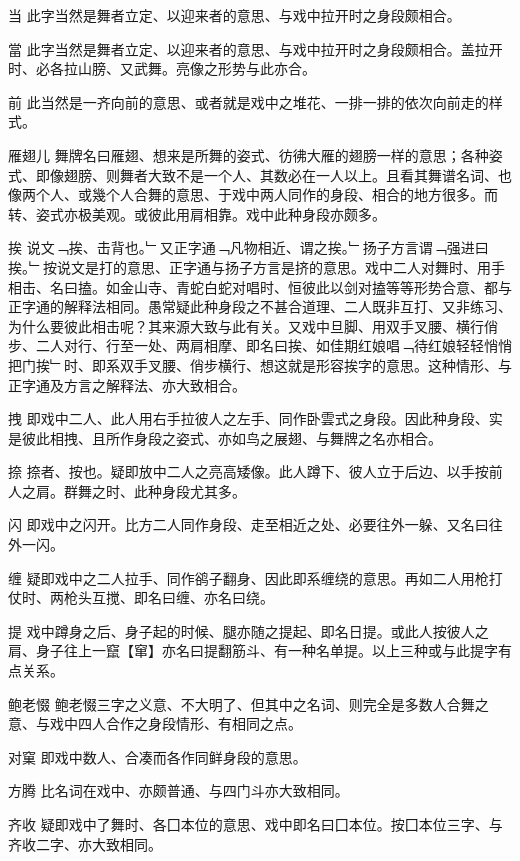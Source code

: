\quad 当
\quad 
此字当然是舞者立定、以迎来者的意思、与戏中拉开时之身段颇相合。

\quad 當
\quad 
此字当然是舞者立定、以迎来者的意思、与戏中拉开时之身段颇相合。盖拉开时、必各拉山膀、又武舞。亮像之形势与此亦合。

\quad 前
\quad 
此当然是一齐向前的意思、或者就是戏中之堆花、一排一排的依次向前走的样式。

\quad 雁翅儿
\quad 
舞牌名曰雁翅、想来是所舞的姿式、彷彿大雁的翅膀一样的意思；各种姿式、即像翅膀、则舞者大致不是一个人、其数必在一人以上。且看其舞谱名词、也像两个人、或幾个人合舞的意思、于戏中两人同作的身段、相合的地方很多。而转、姿式亦极美观。或彼此用肩相靠。戏中此种身段亦颇多。

\quad 挨
\quad 
说文﹁挨、击背也。﹂又正字通﹁凡物相近、谓之挨。﹂扬子方言谓﹁强进曰挨。﹂按说文是打的意思、正字通与扬子方言是挤的意思。戏中二人对舞时、用手相击、名曰搕。如金山寺、青蛇白蛇对唱时、恒彼此以剑对搕等等形势合意、都与正字通的解释法相同。愚常疑此种身段之不甚合道理、二人既非互打、又非练习、为什么要彼此相击呢？其来源大致与此有关。又戏中旦脚、用双手叉腰、横行俏步、二人对行、行至一处、两肩相摩、即名曰挨、如佳期红娘唱﹁待红娘轻轻悄悄把门挨﹂时、即系双手叉腰、俏步横行、想这就是形容挨字的意思。这种情形、与正字通及方言之解释法、亦大致相合。

\quad 拽
\quad 
即戏中二人、此人用右手拉彼人之左手、同作卧雲式之身段。因此种身段、实是彼此相拽、且所作身段之姿式、亦如鸟之展翅、与舞牌之名亦相合。

\quad 捺
\quad 
捺者、按也。疑即放中二人之亮高矮像。此人蹲下、彼人立于后边、以手按前人之肩。群舞之时、此种身段尤其多。

\quad 闪
\quad 
即戏中之闪开。比方二人同作身段、走至相近之处、必要往外一躲、又名曰往外一闪。

\quad 缠
\quad 
疑即戏中之二人拉手、同作鹆子翻身、因此即系缠绕的意思。再如二人用枪打仗时、两枪头互搅、即名曰缠、亦名曰绕。

\quad 提
\quad 
戏中蹲身之后、身子起的时候、腿亦随之提起、即名日提。或此人按彼人之肩、身子往上一竄【窜】亦名曰提翻筋斗、有一种名单提。以上三种或与此提字有点关系。

\quad 鲍老惙
\quad 
鲍老惙三字之义意、不大明了、但其中之名词、则完全是多数人合舞之意、与戏中四人合作之身段情形、有相同之点。

\quad 对窠
\quad 
即戏中数人、合凑而各作同鲜身段的意思。

\quad 方腾
\quad 
比名词在戏中、亦颇普通、与四门斗亦大致相同。

\quad 齐收
\quad 
疑即戏中了舞时、各囗本位的意思、戏中即名曰囗本位。按囗本位三字、与齐收二字、亦大致相同。

